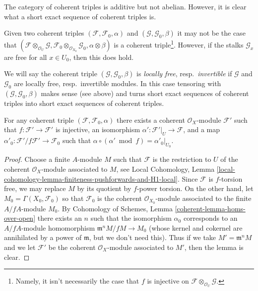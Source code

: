 \medskip\noindent
The category of coherent triples is additive but not abelian.
However, it is clear what a short exact sequence of coherent
triples is.

\medskip\noindent
Given two coherent triples $(\mathcal{F}, \mathcal{F}_0, \alpha)$
and $(\mathcal{G}, \mathcal{G}_0, \beta)$ it may not be the case that
$(\mathcal{F} \otimes_{\mathcal{O}_U} \mathcal{G},
\mathcal{F}_0  \otimes_{\mathcal{O}_{X_0}} \mathcal{G}_0,
\alpha \otimes \beta)$ is a coherent triple\footnote{Namely, it
isn't necessarily the case that $f$
is injective on $\mathcal{F} \otimes_{\mathcal{O}_U} \mathcal{G}$.}.
However, if the stalks $\mathcal{G}_x$ are
free for all $x \in U_0$, then this does hold.

\medskip\noindent
We will say the coherent triple $(\mathcal{G}, \mathcal{G}_0, \beta)$
is {\it locally free}, resp.\ {\it invertible}
if $\mathcal{G}$ and $\mathcal{G}_0$
are locally free, resp.\ invertible modules. In this case tensoring
with $(\mathcal{G}, \mathcal{G}_0, \beta)$ makes sense (see above)
and turns short exact sequences of coherent triples into short exact
sequences of coherent triples.

\begin{lemma}
\label{lemma-prepare-chi-triple}
For any coherent triple $(\mathcal{F}, \mathcal{F}_0, \alpha)$
there exists a coherent $\mathcal{O}_X$-module $\mathcal{F}'$
such that $f : \mathcal{F}' \to \mathcal{F}'$ is injective,
an isomorphism $\alpha' : \mathcal{F}'|_U \to \mathcal{F}$, and a map
$\alpha'_0 : \mathcal{F}'/f\mathcal{F}' \to \mathcal{F}_0$
such that $\alpha \circ (\alpha' \bmod f) = \alpha'_0|_{U_0}$.
\end{lemma}

\begin{proof}
Choose a finite $A$-module $M$ such that $\mathcal{F}$ is the restriction
to $U$ of the coherent $\mathcal{O}_X$-module associated to $M$, see
Local Cohomology, Lemma
\ref{local-cohomology-lemma-finiteness-pushforwards-and-H1-local}.
Since $\mathcal{F}$ is $f$-torsion free, we may replace $M$ by
its quotient by $f$-power torsion.
On the other hand, let $M_0 = \Gamma(X_0, \mathcal{F}_0)$
so that $\mathcal{F}_0$ is the coherent $\mathcal{O}_{X_0}$-module
associated to the finite $A/fA$-module $M_0$.
By Cohomology of Schemes, Lemma \ref{coherent-lemma-homs-over-open}
there exists an $n$ such that the
isomorphism $\alpha_0$ corresponds to an $A/fA$-module homomorphism
$\mathfrak m^n M/fM \to M_0$ (whose kernel and cokernel
are annihilated by a power of $\mathfrak m$, but we don't need this).
Thus if we take $M' = \mathfrak m^n M$ and we let
$\mathcal{F}'$ be the coherent $\mathcal{O}_X$-module
associated to $M'$, then the lemma is clear.
\end{proof}

